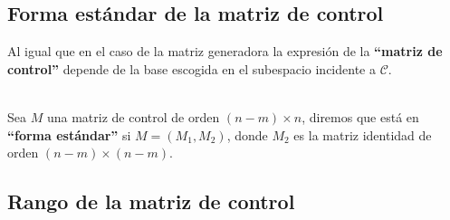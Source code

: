 \subsection{Forma est\'andar de la matriz de control}

Al igual que en el caso de la matriz generadora la expresi\'on de la 
\textbf{``matriz de control''} depende de la base escogida en el subespacio
incidente a $\mathcal{C}$.

\begin{definicion}
\ \\
Sea $M$ una matriz de control de orden $(n-m)\times n$, diremos que est\'a en
\textbf{``forma est\'andar''} si $M=(M_1,M_2)$, donde $M_2$ es la matriz
identidad de orden $(n-m)\times (n-m)$.
\end{definicion}
%
\newpage
%
\subsection{Rango de la matriz de control}


